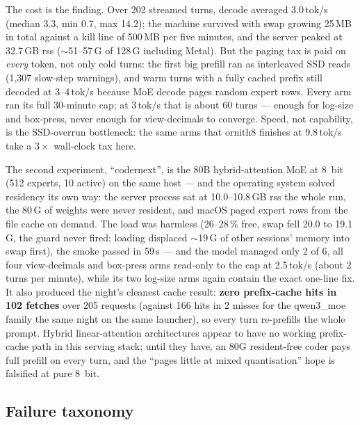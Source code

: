 The cost is the finding. Over 202 streamed turns, decode averaged 3.0\,tok/s (median 3.3, min 0.7, max 14.2);
the machine survived with swap growing 25\,MB in total against a kill line of 500\,MB per five minutes, and the
server peaked at 32.7\,GB rss (${\sim}$51--57\,G of 128\,G including Metal). But the paging tax is paid on
\emph{every} token, not only cold turns: the first big prefill ran as interleaved SSD reads (1{,}307 slow-step
warnings), and warm turns with a fully cached prefix still decoded at 3--4\,tok/s because MoE decode pages
random expert rows. Every arm ran its full 30-minute cap; at 3\,tok/s that is about 60 turns --- enough for
log-size and box-press, never enough for view-decimals to converge. Speed, not capability, is the SSD-overrun
bottleneck: the same arms that ornith8 finishes at 9.8\,tok/s take a $3\times$ wall-clock tax here.

The second experiment, ``codernext'', is the 80B hybrid-attention MoE at 8~bit (512 experts, 10 active) on the
same host --- and the operating system solved residency its own way: the server process sat at 10.0--10.8\,GB rss
the whole run, the 80\,G of weights were never resident, and macOS paged expert rows from the file cache on
demand. The load was harmless (26--28\,\% free, swap fell 20.0 to 19.1\,G, the guard never fired; loading
displaced ${\sim}$19\,G of other sessions' memory into swap first), the smoke passed in 59\,s --- and the model
managed only 2 of 6, all four view-decimals and box-press arms read-only to the cap at 2.5\,tok/s (about 2
turns per minute), while its two log-size arms again contain the exact one-line fix. It also produced the
night's cleanest cache result: \textbf{zero prefix-cache hits in 102 fetches} over 205 requests (against 166
hits in 2 misses for the qwen3\_moe family the same night on the same launcher), so every turn re-prefills the
whole prompt. Hybrid linear-attention architectures appear to have no working prefix-cache path in this serving
stack; until they have, an 80G resident-free coder pays full prefill on every turn, and the ``pages little at
mixed quantisation'' hope is falsified at pure 8~bit.

\subsection{Failure taxonomy}\label{sec:taxonomy}

